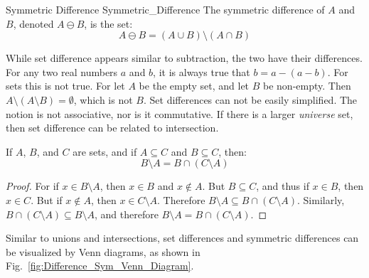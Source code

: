             \begin{ldefinition}{Symmetric Difference}
                  {Symmetric_Difference}
                The symmetric difference of $A$ and $B$, denoted
                $A\ominus{B}$, is the set:
                \begin{equation}
                    A\ominus{B}
                    =(A\cup{B})\setminus(A\cap{B})
                \end{equation}
            \end{ldefinition}
            While set difference appears similar to subtraction,
            the two have their differences. For any two real
            numbers $a$ and $b$, it is always true that
            $b=a-(a-b)$. For sets this is not true. For let $A$
            be the empty set, and let $B$ be non-empty.
            Then $A\setminus(A\setminus{B})=\emptyset$, which
            is not $B$. Set differences can not be easily
            simplified. The notion is not associative, nor is it
            commutative. If there is a larger \textit{universe}
            set, then set difference can be related to
            intersection.
            \begin{theorem}
                \label{thm:Set_Difference_As_Intersection}%
                If $A$, $B$, and $C$ are sets, and if
                $A\subseteq{C}$ and $B\subseteq{C}$, then:
                \begin{equation}
                    B\setminus{A}=B\cap(C\setminus{A})
                \end{equation}
            \end{theorem}
            \begin{proof}
                For if $x\in{B}\setminus{A}$, then
                $x\in{B}$ and $x\notin{A}$. But
                $B\subseteq{C}$, and thus if $x\in{B}$, then
                $x\in{C}$. But if $x\notin{A}$, then
                $x\in{C}\setminus{A}$. Therefore
                $B\setminus{A}\subseteq{B}\cap(C\setminus{A})$.
                Similarly,
                $B\cap(C\setminus{A})\subseteq{B}\setminus{A}$,
                and therefore
                $B\setminus{A}={B}\cap(C\setminus{A})$.
            \end{proof}
            Similar to unions and intersections,
            set differences and symmetric differences can be
            visualized by Venn diagrams, as shown in
            Fig.~\ref{fig:Difference_Sym_Venn_Diagram}.
